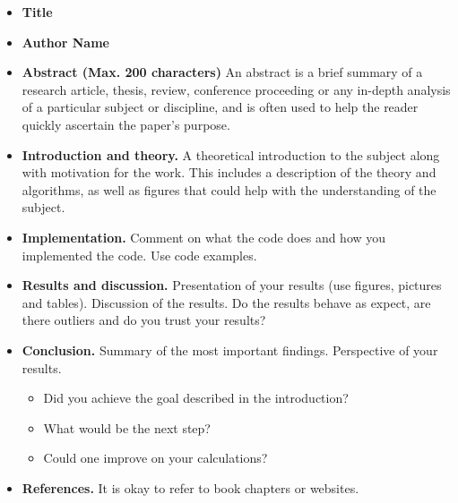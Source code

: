 \documentclass{article}
\begin{document}
\begin{itemize}

    \item {\bf Title}

    \item {\bf Author Name}


    \item {\bf Abstract (Max. 200 characters)}
            An abstract is a brief summary of a research article, thesis, review, conference proceeding or any in-depth analysis of a particular subject or discipline, and is often used to help the reader quickly ascertain the paper's purpose.


    \item {\bf Introduction and theory.}
    A theoretical introduction to the subject along with motivation for the work.
    This includes a description of the theory and algorithms, as well as figures that could help with the understanding of the subject.

    \item {\bf Implementation.}
    Comment on what the code does and how you implemented the code.
    Use code examples.

    \item {\bf Results and discussion.}
    Presentation of your results (use figures, pictures and tables).
    Discussion of the results.
    Do the results behave as expect, are there outliers and 
    do you trust your results?

    \item {\bf Conclusion.}
    Summary of the most important findings.
    Perspective of your results.

    \begin{itemize}
        \item Did you achieve the goal described in the introduction?
        \item What would be the next step?
        \item Could one improve on your calculations?
    \end{itemize}

    \item {\bf References.}
    It is okay to refer to book chapters or websites.

\end{itemize}











\end{document}
